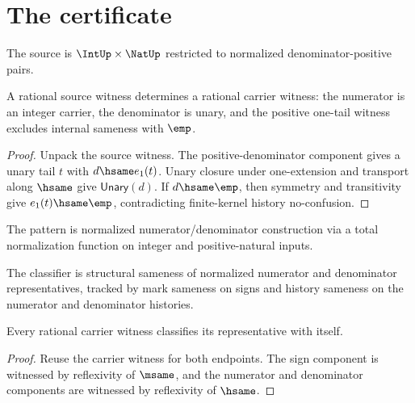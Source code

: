 \section{The certificate}

\begin{definition}
\label{def:rat-source-specification}
The source is $\IntUp \times \NatUp$ restricted to normalized denominator-positive pairs.
\end{definition}

\begin{theorem}
\label{thm:rat-source-spec-to-carrier}
A rational source witness determines a rational carrier witness: the numerator
is an integer carrier, the denominator is unary, and the positive one-tail
witness excludes internal sameness with $\emp$.
\end{theorem}
\begin{proof}
Unpack the source witness. The positive-denominator component gives a unary
tail $t$ with $d \hsame e_1(t)$. Unary closure under one-extension and
transport along $\hsame$ give $\mathsf{Unary}(d)$. If $d\hsame \emp$,
then symmetry and transitivity give $e_1(t)\hsame \emp$, contradicting
finite-kernel history no-confusion.
\end{proof}

\begin{definition}
\label{def:rat-pattern-specification}
The pattern is normalized numerator/denominator construction via a total normalization function on integer and positive-natural inputs.
\end{definition}

\begin{definition}
\label{def:rat-classifier-specification}
The classifier is structural sameness of normalized numerator and denominator representatives, tracked by mark sameness on signs and history sameness on the numerator and denominator histories.
\end{definition}

\begin{theorem}
\label{thm:rat-classifier-reflexivity}
Every rational carrier witness classifies its representative with itself.
\end{theorem}
\begin{proof}
Reuse the carrier witness for both endpoints. The sign component is witnessed by reflexivity of $\msame$, and the numerator and denominator components are witnessed by reflexivity of $\hsame$.
\end{proof}

